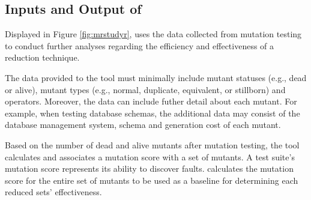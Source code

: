 \subsection{Inputs and Output of \mr}
Displayed in Figure \ref{fig:mrstudyr}, \mr uses the data collected
from mutation testing to conduct further analyses
regarding the efficiency and effectiveness of a reduction technique.

The data provided to the \mr tool must minimally include mutant statuses (e.g., dead or alive),
mutant types (e.g., normal, duplicate, equivalent, or stillborn)
and operators. Moreover, the data can include futher detail about each mutant.
For example, when testing database schemas, the additional data may consist of
the database management system, schema and generation cost of each mutant.

Based on the number of dead and alive mutants after mutation testing,
the \mr tool calculates and associates a mutation score with a set of mutants.
A test suite's mutation score represents its ability to discover faults.
\mr calculates the mutation score for the entire set of mutants to be
used as a baseline for determining each reduced sets' effectiveness.
